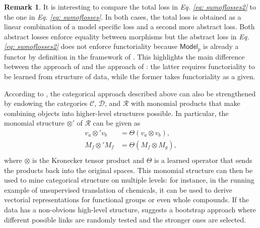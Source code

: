 \documentclass[11pt,a4paper,openright,twoside]{report}
\newcounter{mycounter}
\theoremstyle{plain}
\theoremstyle{definition}
\newtheorem{remark}[mycounter]{Remark}
\begin{document}
\begin{remark}
  It is interesting to compare the total loss in \textit{Eq. \ref{eq: sumoflosses2}} to the one in \textit{Eq. \ref{eq: sumoflosses}}. In both cases, the total loss is obtained as a linear combination of a model specific loss and a second more abstract loss. Both abstract losses enforce equality between morphisms but the abstract loss in \textit{Eq. \ref{eq: sumoflosses2}} does not enforce functoriality because $\mathsf{Model}_p$ is already a functor by definition in the framework of \cite{gavranovic2019compositional}. This highlights the main difference between the approach of \cite{gavranovic2019compositional} and the approach of \cite{sheshmani2021categorical}: the latter requires functoriality to be learned from structure of data, while the former takes functoriality as a given.
\end{remark}


According to \cite{sheshmani2021categorical}, the categorical approach described above can also be strengthened by endowing the categories $\mathcal{C}$, $\mathcal{D}$, and $\mathcal{R}$ with monomial products that make combining objects into higher-level structures possible. In particular, the monomial structure $\otimes'$ of $\mathcal{R}$ can be given as
\begin{align*}
  v_a \otimes' v_b &= \Theta(v_a \otimes v_b),\\
  M_f \otimes' M_f &= \Theta(M_f \otimes M_g),\\
\end{align*}
where $\otimes$ is the Kronecker tensor product and $\Theta$ is a learned operator that sends the products back into the original spaces. This monomial structure can then be used to mine categorical structure on multiple levels: for instance, in the running example of unsupervised translation of chemicals, it can be used to derive vectorial representations for functional groups or even whole compounds. If the data has a non-obvious high-level structure, \cite{sheshmani2021categorical} suggests a bootstrap approach where different possible links are randomly tested and the stronger ones are selected.
\end{document}
